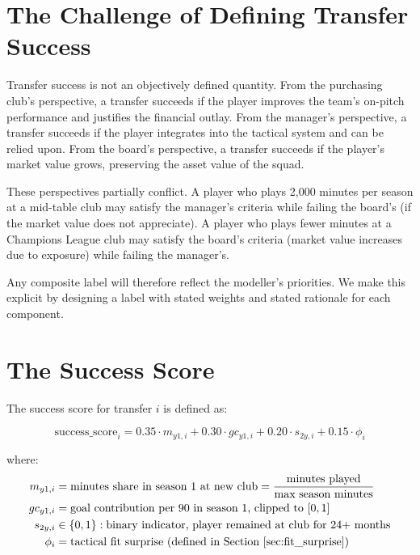 \documentclass[12pt, a4paper, oneside]{report}
\begin{document}
\section{The Challenge of Defining Transfer Success}

Transfer success is not an objectively defined quantity. From the purchasing club's perspective, a transfer succeeds if the player improves the team's on-pitch performance and justifies the financial outlay. From the manager's perspective, a transfer succeeds if the player integrates into the tactical system and can be relied upon. From the board's perspective, a transfer succeeds if the player's market value grows, preserving the asset value of the squad.

These perspectives partially conflict. A player who plays 2,000 minutes per season at a mid-table club may satisfy the manager's criteria while failing the board's (if the market value does not appreciate). A player who plays fewer minutes at a Champions League club may satisfy the board's criteria (market value increases due to exposure) while failing the manager's.

Any composite label will therefore reflect the modeller's priorities. We make this explicit by designing a label with stated weights and stated rationale for each component.

\section{The Success Score}
\label{sec:success_score}

The success score for transfer $i$ is defined as:

\begin{equation}
\label{eq:success_score}
\text{success\_score}_i = 0.35 \cdot m_{y1,i} + 0.30 \cdot gc_{y1,i} + 0.20 \cdot s_{2y,i} + 0.15 \cdot \phi_i
\end{equation}

where:
\begin{align*}
m_{y1,i}   &= \text{minutes share in season 1 at new club} = \frac{\text{minutes played}}{\text{max season minutes}} \\
gc_{y1,i}  &= \text{goal contribution per 90 in season 1, clipped to } [0, 1] \\
s_{2y,i}   &\in \{0, 1\} : \text{binary indicator, player remained at club for 24+ months} \\
\phi_i     &= \text{tactical fit surprise (defined in Section~\ref{sec:fit_surprise})}
\end{align*}
\end{document}
